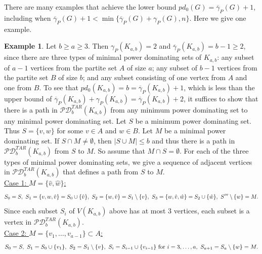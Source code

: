 \documentclass{article}
\numberwithin{figure}{section}   %
\theoremstyle{definition}
\theoremstyle{definition}
\theoremstyle{definition}
\newtheorem{ex}[thm]{Example}
\newcommand{\ol}{\overline}
\newcommand{\pd}{\gamma_P}
\newcommand{\pdbar}{\ol\pd}
\newcommand{\tar}{\mathscr{PD}^{TAR}}
\newcommand{\pdo}{pd_0}
\begin{document}
There are many examples that achieve the lower bound $\pdo(G)=\pdbar(G)+1$, including when   $\pdbar(G)+1< \min\{\pdbar(G)+\pd(G),n\}.$  Here we give one example.




\begin{ex}\label{TAR:compbipart} Let $b\ge a\ge 3$.  Then $\pd(K_{a,b})=2$ and $\pdbar(K_{a,b})=b-1\ge 2$, since there are three types of minimal power dominating sets of $K_{a,b}$: any subset of $a-1$ vertices from the partite set $A$ of size $a$; any subset of $b-1$ vertices from the partite set $B$ of size $b$; and any subset consisting of one vertex from $A$ and one from $B$.  
To see that  $\pdo(K_{a,b})=b=\pdbar(K_{a,b})+1$, which is less than the upper bound of $\pdbar(K_{a,b})+\pd(K_{a,b}) = \pdbar(K_{a,b})+2$, it suffices to show that there is a path in $\tar_b (K_{a,b})$ from any minimum power dominating set to any minimal power dominating set.  Let $S$ be a minimum power dominating set.  Thus $S = \{v,w\}$ for some $v \in A$ and $w \in B$.  Let $M$ be a minimal power dominating set. If $S\cap M\ne \emptyset$, then $|S\cup M|\le b$ and thus there is a path in $\tar_b (K_{a,b})$ from $S$ to $M$. So assume that $M \cap S = \emptyset$. For each of the three types of minimal power dominating sets, we give a sequence of adjacent vertices in $\tar_b (K_{a,b})$ that defines a path from $S$ to $M$.  \\[1mm]
 \underline{Case 1:  $M = \{\hat{v},\hat{w}\}$:}\vspace{-6pt}
 \[S_0=S, \  S_1 =\{v,w,\hat v\}= S_0 \cup \{\hat{v}\},  \ S_2 =\{w,\hat v\} = S_1 \setminus \{v\}, \  S_3=\{w,\hat v,\hat w\}=S_2 \cup \{\hat{w}\}, \  S'''\setminus \{w\} = M.\vspace{-6pt}\]
 Since each subset $S_i$ of $V(K_{a,b})$ above has at most 3 vertices,  each subset is a vertex in $\tar_b (K_{a,b})$. \\[1mm]
  \underline{Case 2:  $M = \{v_1, \ldots, v_{a-1}\} \subset A$:}\vspace{-4pt}
 \[S_0=S, \ S_1 = S_0 \cup \{v_1\}, \ S_2 = S_1 \setminus \{v\}, \ S_{i} = S_{i-1} \cup \{v_{i-1}\} \mbox{ for } i=3, \ldots, a, \  S_{a+1}=S_{a} \setminus \{w\} = M.\vspace{-6pt}\]   

\end{ex}
\end{document}
